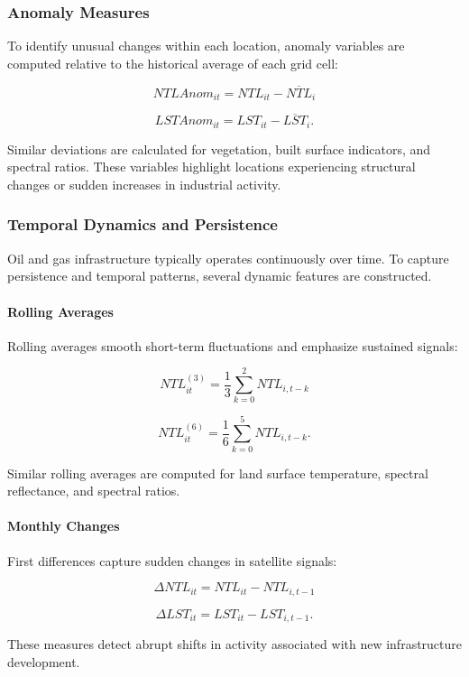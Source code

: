 \documentclass[12pt]{article}
\begin{document}
\subsubsection{Anomaly Measures}

To identify unusual changes within each location, anomaly variables are computed relative to the historical average of each grid cell:

\[
NTLAnom_{it} = NTL_{it} - \overline{NTL}_i
\]

\[
LSTAnom_{it} = LST_{it} - \overline{LST}_i.
\]

Similar deviations are calculated for vegetation, built surface indicators, and spectral ratios. These variables highlight locations experiencing structural changes or sudden increases in industrial activity.

\subsubsection{Temporal Dynamics and Persistence}

Oil and gas infrastructure typically operates continuously over time. To capture persistence and temporal patterns, several dynamic features are constructed.

\paragraph{Rolling Averages}

Rolling averages smooth short-term fluctuations and emphasize sustained signals:

\[
NTL^{(3)}_{it} = \frac{1}{3}\sum_{k=0}^{2} NTL_{i,t-k}
\]

\[
NTL^{(6)}_{it} = \frac{1}{6}\sum_{k=0}^{5} NTL_{i,t-k}.
\]

Similar rolling averages are computed for land surface temperature, spectral reflectance, and spectral ratios.

\paragraph{Monthly Changes}

First differences capture sudden changes in satellite signals:

\[
\Delta NTL_{it} = NTL_{it} - NTL_{i,t-1}
\]

\[
\Delta LST_{it} = LST_{it} - LST_{i,t-1}.
\]

These measures detect abrupt shifts in activity associated with new infrastructure development.
\end{document}
